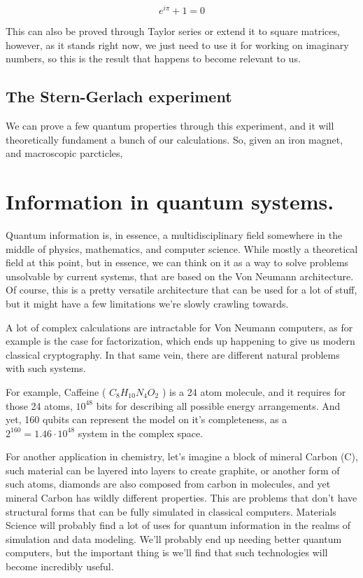 \documentclass{textbook}
\begin{document}
$$ e^{i\pi} + 1 = 0$$

This can also be proved through Taylor series or extend it to square matrices, however,
as it stands right now, we just need to use it for working on imaginary numbers, so this is the
result that happens to become relevant to us.

\subsection{}

\section{The Stern-Gerlach experiment}

We can prove a few quantum properties through this experiment, and it will theoretically fundament a bunch of our calculations.
So, given an iron magnet, and macroscopic parcticles,

\chapter{Information in quantum systems.}

Quantum information is, in essence, a multidisciplinary field somewhere in the middle
of physics, mathematics, and computer science. While mostly a theoretical field at this point,
but in essence, we can think on it as a way to solve problems unsolvable by current systems, that
are based on the Von Neumann architecture. Of course, this is a pretty versatile architecture that
can be used for a lot of stuff, but it might have a few limitations we're slowly crawling towards.

A lot of complex calculations are intractable for Von Neumann computers, as for example
is the case for factorization, which ends up happening to give us modern classical cryptography. In that same vein,
there are different natural problems with such systems.

For example, Caffeine ( $C_{8}H_{10}N_{4}O_{2}$ ) is a 24 atom molecule, and it requires for those 24 atoms, $10^{48}$ bits
for describing all possible energy arrangements. And yet, 160 qubits can represent the model on
it's completeness, as a $2^{160} = 1.46 \cdot 10^{48}$ system in the complex space.

For another application in chemistry, let's imagine a block of mineral Carbon (C), such material can be layered into
layers to create graphite, or another form of such atoms, diamonds are also composed from carbon in molecules, and yet
mineral Carbon  has wildly different properties. This are problems that don't have structural forms that can be fully simulated
in classical computers. Materials Science will probably find a lot of uses for quantum information in the realms of simulation and
data modeling. We'll probably end up needing better quantum computers, but the important thing is we'll find that such technologies will
become incredibly useful.
\end{document}
